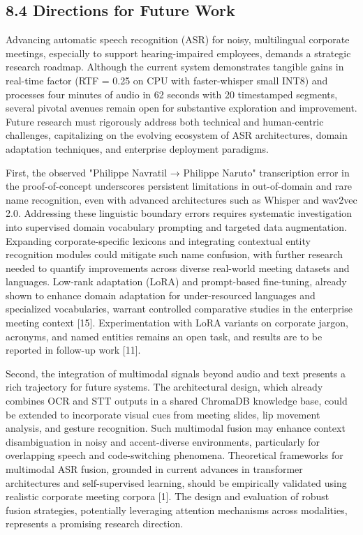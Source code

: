 \documentclass[12pt,a4paper]{article}
\begin{document}
\subsection{8.4 Directions for Future Work}


Advancing automatic speech recognition (ASR) for noisy, multilingual corporate meetings, especially to support hearing-impaired employees, demands a strategic research roadmap. Although the current system demonstrates tangible gains in real-time factor (RTF = 0.25 on CPU with faster-whisper small INT8) and processes four minutes of audio in 62 seconds with 20 timestamped segments, several pivotal avenues remain open for substantive exploration and improvement. Future research must rigorously address both technical and human-centric challenges, capitalizing on the evolving ecosystem of ASR architectures, domain adaptation techniques, and enterprise deployment paradigms.


First, the observed "Philippe Navratil → Philippe Naruto" transcription error in the proof-of-concept underscores persistent limitations in out-of-domain and rare name recognition, even with advanced architectures such as Whisper and wav2vec 2.0. Addressing these linguistic boundary errors requires systematic investigation into supervised domain vocabulary prompting and targeted data augmentation. Expanding corporate-specific lexicons and integrating contextual entity recognition modules could mitigate such name confusion, with further research needed to quantify improvements across diverse real-world meeting datasets and languages. Low-rank adaptation (LoRA) and prompt-based fine-tuning, already shown to enhance domain adaptation for under-resourced languages and specialized vocabularies, warrant controlled comparative studies in the enterprise meeting context [15]. Experimentation with LoRA variants on corporate jargon, acronyms, and named entities remains an open task, and results are to be reported in follow-up work [11].


Second, the integration of multimodal signals beyond audio and text presents a rich trajectory for future systems. The architectural design, which already combines OCR and STT outputs in a shared ChromaDB knowledge base, could be extended to incorporate visual cues from meeting slides, lip movement analysis, and gesture recognition. Such multimodal fusion may enhance context disambiguation in noisy and accent-diverse environments, particularly for overlapping speech and code-switching phenomena. Theoretical frameworks for multimodal ASR fusion, grounded in current advances in transformer architectures and self-supervised learning, should be empirically validated using realistic corporate meeting corpora [1]. The design and evaluation of robust fusion strategies, potentially leveraging attention mechanisms across modalities, represents a promising research direction.
\end{document}
